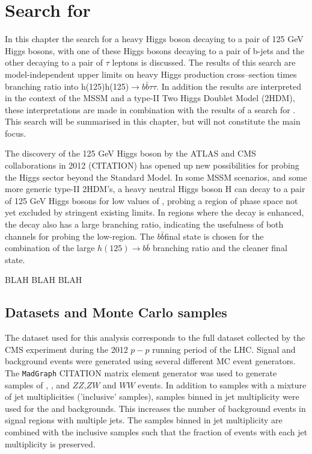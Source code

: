 \chapter{\texorpdfstring{Search for \hhhtautaubb}{Search for H -> hh -> tautaubb}}
\label{sec:hhh}

In this chapter the search for a heavy Higgs boson decaying to a pair of 125 GeV Higgs bosons, with one of these Higgs bosons decaying to 
a pair of b-jets and the other decaying to a pair of $\tau$ leptons is discussed. The results of this search are model-independent
upper limits on heavy Higgs production cross--section times branching ratio into h(125)h(125)$\rightarrow b\bar{b} \tau\tau$. In addition 
the results are interpreted in the context of the MSSM and a type-II Two Higgs Doublet Model (2HDM), these interpretations are made
in combination with the results of a search for \azhlltautau. This search will be summarised in this
chapter, but will not constitute the main focus.

The discovery of the 125 GeV Higgs boson by the ATLAS and CMS collaborations in 2012 (CITATION) has opened up
new possibilities for probing the Higgs sector beyond the Standard Model. In some MSSM scenarios, and some more
generic type-II 2HDM's, a heavy neutral Higgs boson H can decay to a pair of 125 GeV Higgs bosons for low values
of \tanb, probing a region of phase space not yet excluded by stringent existing limits. In regions where
the decay \hhh is enhanced, the \azh decay also has a large branching ratio, indicating the usefulness
of both channels for probing the low-\tanb region. The $b\bar{b}$\tautau final state is chosen for the combination
of the large $h(125) \rightarrow b\bar{b}$ branching ratio and the cleaner \htautau final state.

BLAH BLAH BLAH

\section{Datasets and Monte Carlo samples}
\label{sec:hhh_datasets}
The dataset used for this analysis corresponds to the full dataset collected by the CMS experiment during the 2012 $p-p$ 
running period of the LHC. 
Signal and background events were generated using several different MC event generators. The \texttt{MadGraph}
CITATION matrix element generator was used to generate samples of \wjets, \zellell, \ttbar and $ZZ$,$ZW$ and $WW$
events. In addition to samples with a mixture of jet multiplicities ('inclusive' samples), samples binned in jet multiplicity
were used for the \wjets and \zellell backgrounds. This increases the number of background events
in signal regions with multiple jets. The samples binned in jet multiplicity are combined with the
inclusive samples such that the fraction of events with each jet multiplicity is preserved.

